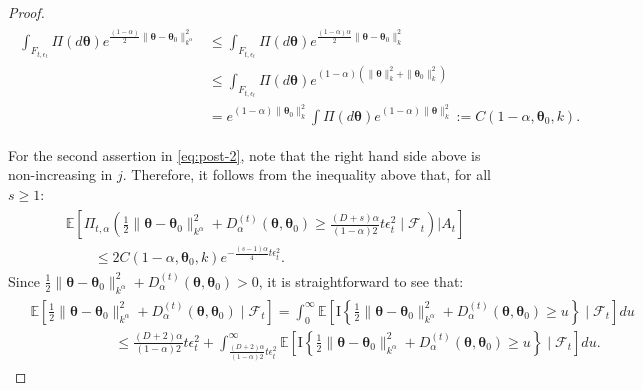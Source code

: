 \documentclass[final,12pt]{colt2026} %
\begin{document}
\begin{proof}
\begin{align}\label{eq:MABDE9a}
\begin{split}
    \int_{F_{t, \epsilon_t}} \Pi(d\pmb \theta) e^{\frac{(1-\alpha) }{2} \|\pmb \theta-\pmb \theta_0\|_{k^\alpha}^2} &\leq \int_{F_{t, \epsilon_t}} \Pi(d\pmb \theta) e^{\frac{(1-\alpha)\alpha }{2} \|\pmb \theta-\pmb \theta_0\|_{k}^2}\\
    &\leq \int_{F_{t, \epsilon_t}} \Pi(d\pmb \theta) e^{{ (1-\alpha)} (\|\pmb \theta\|_k^2+\|\pmb \theta_0\|_k^2)}\\
    &= e^{{ (1-\alpha)} \|\pmb \theta_0\|_k^2} \int \Pi(d\pmb \theta)e^{{ (1-\alpha)} \|\pmb \theta\|_k^2}:= C(1-\alpha,\pmb \theta_0,k).
\end{split}
\end{align} 
    
For the second assertion in \eqref{eq:post-2}, note that the right hand side above is non-increasing in $j$. Therefore, it follows from the inequality above that, for all $s\geq 1$:
\begin{align}\label{eq:MABDE10}
\begin{split}
&\mathbb{E}\left[\Pi_{t,\alpha}\left(\frac{1}{2}\|\pmb \theta-\pmb \theta_0\|_{k^\alpha}^2 + D_{\alpha}^{(t)}(\pmb \theta,\pmb \theta_0) \geq \frac{(D+s)\alpha}{(1-\alpha)2} t\epsilon_t^2 \;\Big|\;\mathcal{F}_{t}\right) \Big | A_t  \right]\\
&\qquad \leq  2 C(1-\alpha,\pmb \theta_0,k) e^{ - \frac{(s-1)\alpha}{4}  t\epsilon_t^2 } .
\end{split}
\end{align}
Since $\frac{1}{2}\|\pmb \theta-\pmb \theta_0\|_{k^\alpha}^2 + D_{\alpha}^{(t)}(\pmb \theta,\pmb \theta_0)>0$, it is straightforward to see that:
\begin{align*}
\begin{split}
&\mathbb{E}\left[\frac{1}{2}\|\pmb \theta-\pmb \theta_0\|_{k^\alpha}^2 + D_{\alpha}^{(t)}(\pmb \theta,\pmb \theta_0)\;\Big|\;\mathcal{F}_{t} \right] = \int_{0}^{\infty} \mathbb{E}\left[\text{I}\left\{\frac{1}{2}\|\pmb \theta-\pmb \theta_0\|_{k^\alpha}^2 + D_{\alpha}^{(t)}(\pmb \theta,\pmb \theta_0) \geq u \right\}\;\Big|\;\mathcal{F}_{t} \right] du
\\
&\qquad \qquad\qquad \leq \frac{(D+2)\alpha}{(1-\alpha)2} t\epsilon_t^2 + \int_{\frac{(D+2)\alpha}{(1-\alpha)2} t\epsilon_t^2}^{\infty} \mathbb{E}\left[\text{I}\left\{\frac{1}{2}\|\pmb \theta-\pmb \theta_0\|_{k^\alpha}^2 + D_{\alpha}^{(t)}(\pmb \theta,\pmb \theta_0) \geq u \right\}\;\Big|\;\mathcal{F}_{t} \right]  du.

\end{split}
\end{align*}
\end{proof}
\end{document}
